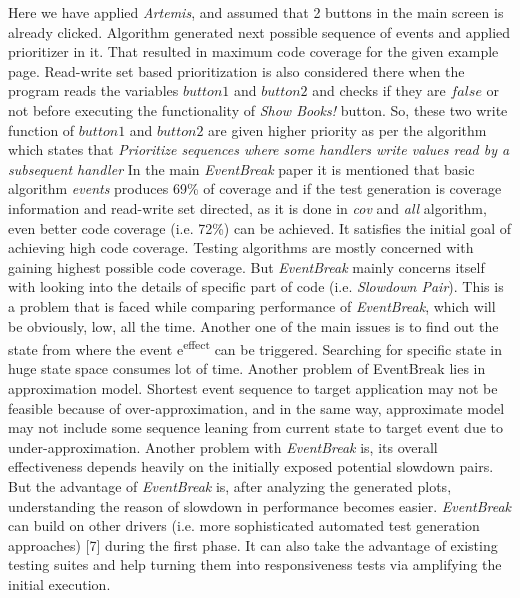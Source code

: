 \documentclass[authoryear,preprint, twocolumn]{sigplanconf}
\begin{document}
\newline Here we have applied \emph{Artemis}, and assumed that 2 buttons in the main screen is already clicked. Algorithm generated next possible sequence of events and applied prioritizer in it. That resulted in maximum code coverage for the given example page. Read-write set based prioritization is also considered there when the program reads the variables $button1$ and $button2$ and checks if they are $false$ or not before executing the functionality of \emph{Show Books!} button. So, these two write function of $button1$ and $button2$ are given higher priority as per the algorithm which states that \textit{Prioritize sequences where some handlers write values read by a subsequent handler} %
In the main \emph{EventBreak} paper it is mentioned that basic algorithm \emph{events} produces 69\% of coverage and if the test generation is coverage information and read-write set directed, as it is done in \emph{cov} and \emph{all} algorithm, even better code coverage (i.e. 72\%) can be achieved. It satisfies the initial goal of achieving high code coverage.
\newline Testing algorithms are mostly concerned with gaining highest possible code coverage. But \emph{EventBreak} mainly concerns itself with looking into the details of specific part of code (i.e. \emph{Slowdown Pair}). This is a problem that is faced while comparing performance of \emph{EventBreak}, which will be obviously, low, all the time.  Another one of the main issues is to find out the state from where the event e\textsuperscript{effect} can be triggered. Searching for specific state in huge state space consumes lot of time. Another problem of EventBreak lies in approximation model. Shortest event sequence to target application may not be feasible because of over-approximation, and in the same way, approximate model may not include some sequence leaning from current state to target event due to under-approximation. Another problem with \emph{EventBreak} is, its overall effectiveness depends heavily on the initially exposed potential slowdown pairs. But the advantage of \emph{EventBreak} is, after analyzing the generated plots, understanding the reason of slowdown in performance becomes easier. \emph{EventBreak} can build on other drivers (i.e. more sophisticated automated test generation approaches) [7] during the first phase. It can also take the advantage of existing testing suites and help turning them into responsiveness tests via amplifying the initial execution. 
\end{document}
